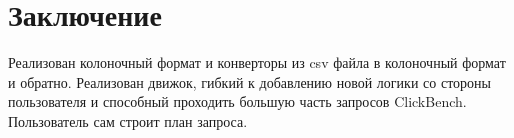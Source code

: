 \documentclass[a4paper,12pt]{extarticle}
\begin{document}
\section{Заключение}
Реализован колоночный формат и конверторы из csv файла в колоночный формат и обратно.
Реализован движок, гибкий к добавлению новой логики
со стороны пользователя и способный проходить большую часть запросов ClickBench.
Пользователь сам строит план запроса.


\newpage
\printbibliography[heading=bibintoc]
\end{document}
